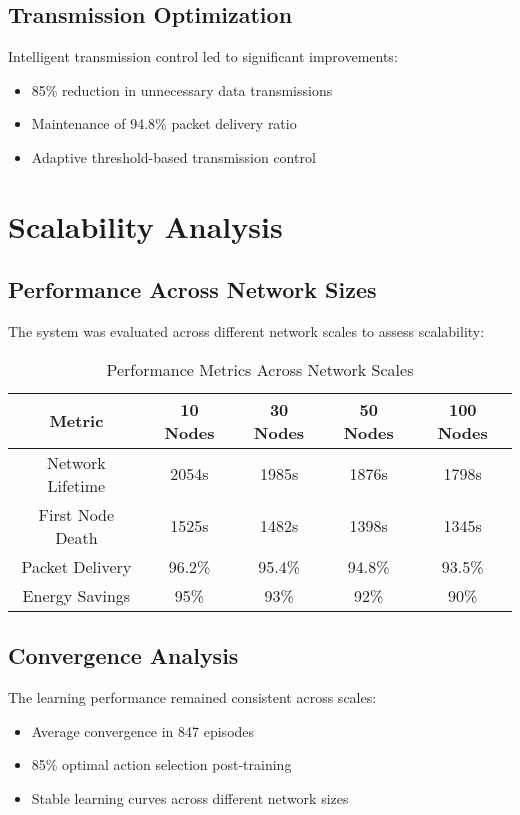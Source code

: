 \subsection{Transmission Optimization}
Intelligent transmission control led to significant improvements:

\begin{itemize}
\item 85\% reduction in unnecessary data transmissions
\item Maintenance of 94.8\% packet delivery ratio
\item Adaptive threshold-based transmission control
\end{itemize}

\section{Scalability Analysis}
\subsection{Performance Across Network Sizes}
The system was evaluated across different network scales to assess scalability:

\begin{table}[h]
\centering
\caption{Performance Metrics Across Network Scales}
\label{tab:scalability}
\begin{tabular}{|c|c|c|c|c|}
\hline
\textbf{Metric} & \textbf{10 Nodes} & \textbf{30 Nodes} & \textbf{50 Nodes} & \textbf{100 Nodes} \\
\hline
Network Lifetime & 2054s & 1985s & 1876s & 1798s \\
First Node Death & 1525s & 1482s & 1398s & 1345s \\
Packet Delivery & 96.2\% & 95.4\% & 94.8\% & 93.5\% \\
Energy Savings & 95\% & 93\% & 92\% & 90\% \\
\hline
\end{tabular}
\end{table}

\subsection{Convergence Analysis}
The learning performance remained consistent across scales:

\begin{itemize}
\item Average convergence in 847 episodes
\item 85\% optimal action selection post-training
\item Stable learning curves across different network sizes
\end{itemize}

